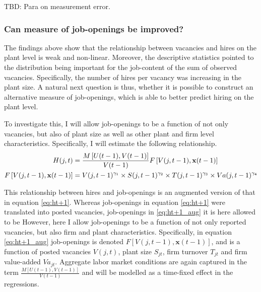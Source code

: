 TBD: Para on measurement error.

\clearpage





 
\subsubsection{Can measure of job-openings be improved?}

The findings above show that the relationship between vacancies and hires on the plant level is weak and non-linear. Moreover, the descriptive statistics pointed to the distribution being important for the job-content of the sum of observed vacancies. Specifically, the number of hires per vacancy was increasing in the plant size. A natural next question is thus, whether it is possible to construct an alternative measure of job-openings, which is able to better predict hiring on the plant level. 

To investigate this, I will allow job-openings to be a function of not only vacancies, but also of plant size as well as other plant and firm level characteristics. Specifically, I will estimate the following relationship. 
\begin{align}
\tiny
H(j,t)&=\frac{M\left[U(t-1), V(t-1)\right]}{V(t-1)} F\left[ V(j,t-1), \mathbf{x}(t-1) \right] 
\label{eq:ht+1_aug} \\
F\left[V(j,t-1),\mathbf{x}(t-1)\right]&=V(j,t-1)^{\gamma_1}  \times  S(j,t-1)^{\gamma_2} \times T(j,t-1)^{\gamma_3} \times  Va(j,t-1)^{\gamma_4} \nonumber
\end{align}

This relationship between hires and job-openings is an augmented version of that in equation \eqref{eq:ht+1}. Whereas job-openings in equation \eqref{eq:ht+1} were translated into posted vacancies, job-openings in \eqref{eq:ht+1_aug} it is here allowed to be   
However, here I allow job-openings to be a function of not only reported vacancies, but also firm and plant characteristics. Specifically, in equation \eqref{eq:ht+1_aug} job-openings is denoted $F\left[V(j,t-1),\mathbf{x}(t-1)\right]$, and is a function of posted vacancies $V(j,t)$, plant size  $S_{jt}$, firm turnover $T_{jt}$ and firm value-added  $Va_{jt}$. Aggregate labor market conditions are again captured in the term $\frac{M\left[U(t-1), V(t-1)\right]}{V(t-1)}$ and will be modelled as a time-fixed effect in the regressions.

